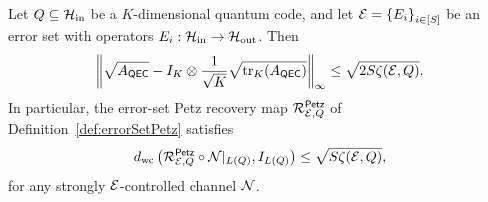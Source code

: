 \documentclass[10pt]{article}
\newcommand{\SIN}{\mathrm{in}}
\newcommand{\SOUT}{\mathrm{out}}
\newcommand{\tr}{\mathrm{tr}}
\newcommand{\p}[1]{\left(#1\right)}
\newcommand{\ppp}[1]{\left\{#1\right\}}
\newcommand{\norm}[1]{\left\|#1\right\|}
\newcommand{\s}[1]{\mathsf{#1}}
\begin{document}
\begin{prop}
    Let $Q\subseteq\calH_{\SIN}$ be a $K$-dimensional quantum code, and let $\calE=\ppp{E_i}_{i\in[S]}$ be an error set with operators $E_i:\calH_{\SIN}\to\calH_{\SOUT}$. Then
    \begin{equation}
        \norm{\sqrt{A_{\s{QEC}}}-I_{K}\otimes \frac{1}{\sqrt{K}}\sqrt{\tr_K(A_{\s{QEC}})}}_{\infty}\leq  {\sqrt{2S\zeta(\calE,Q)}}.\label{eq:BOinequality}
    \end{equation}
    In particular, the error-set Petz recovery map $\calR_{\calE,Q}^{\s{Petz}}$ of Definition~\ref{def:errorSetPetz} satisfies 
     \begin{equation}
        d_{\mathrm{wc}}\p{\calR_{\calE,Q}^{\s{\s{Petz}}}\circ \calN|_{L(Q)},I_{L(Q)}}\leq  {\sqrt{S\zeta(\calE,Q)}},\label{eq:BOboundPetzWC}
     \end{equation}
     for any strongly ${\cal E}$-controlled channel ${\cal N}$.
\end{prop}
\end{document}
